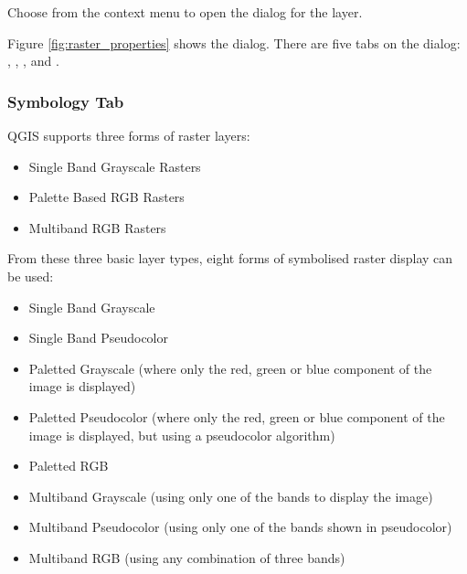 Choose  from the context menu to open the
dialog for the layer.

Figure \ref{fig:raster_properties} shows the  dialog. There are five
tabs on the dialog: , , ,  and .


\subsubsection{Symbology Tab}\label{label_sombology}

QGIS supports three forms of raster layers:

\begin{itemize}
\item Single Band Grayscale Rasters
\item Palette Based RGB Rasters
\item Multiband RGB Rasters
\end{itemize}

From these three basic layer types, eight forms of symbolised raster display
can be used:

\begin{itemize}
\item Single Band Grayscale
\item Single Band Pseudocolor
\item Paletted Grayscale (where only the red, green or blue component of the
image is displayed)
\item Paletted Pseudocolor (where only the red, green or blue component of the
image is displayed, but using a pseudocolor algorithm)
\item Paletted RGB
\item Multiband Grayscale (using only one of the bands to display the image)
\item Multiband Pseudocolor (using only one of the bands shown in
pseudocolor)
\item Multiband RGB (using any combination of three bands)
\end{itemize}

